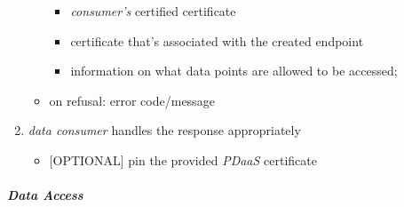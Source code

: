 \documentclass[12pt,english,a4paper,titlepage,cleardoublepage=empty,dottedtoc]{report}
\providecommand{\tightlist}{%
  \setlength{\itemsep}{0pt}\setlength{\parskip}{0pt}}
\begin{document}
\begin{enumerate}
\begin{itemize}
    \begin{itemize}
    \tightlist
    \item
      \emph{consumer's} certified certificate
    \item
      certificate that's associated with the created endpoint
    \item
      information on what data points are allowed to be accessed;
    \end{itemize}
  \item
    on refusal: error code/message
  \end{itemize}
\item
  \emph{data consumer} handles the response appropriately

  \begin{itemize}
  \tightlist
  \item
    {[}OPTIONAL{]} pin the provided \emph{PDaaS} certificate
  \end{itemize}
\end{enumerate}

\subparagraph{Data Access}\label{data-access}
\end{document}
